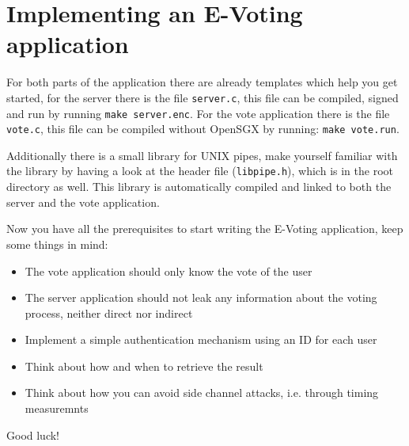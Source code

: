 \documentclass[DIN, pagenumber=false, fontsize=11pt, parskip=half]{scrartcl}
\begin{document}
    \section{Implementing an E-Voting application}
    For both parts of the application there are already templates which help you get
    started, for the server there is the file \texttt{server.c}, this file
    can be compiled, signed and run by running \texttt{make server.enc}.
    For the vote application there is the file \texttt{vote.c}, this
    file can be compiled without OpenSGX by running: \texttt{make vote.run}.    

    Additionally there is a small library for UNIX pipes, make yourself familiar
    with the library by having a look at the header file (\texttt{libpipe.h}),
    which is in the root directory as well. This library is automatically
    compiled and linked to both the server and the vote application.

    Now you have all the prerequisites to start writing the E-Voting application,
    keep some things in mind:
    \begin{itemize}
        \item The vote application should only know the vote of the user
        \item The server application should not leak any information about the voting process, neither direct nor indirect
        \item Implement a simple authentication mechanism using an ID for each user
        \item Think about how and when to retrieve the result
        \item Think about how you can avoid side channel attacks, i.e. through timing measuremnts
    \end{itemize}

    Good luck!
\end{document}
